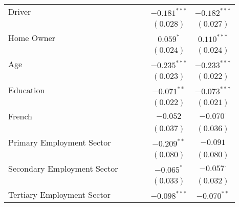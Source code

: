 \begin{center}
\begin{tiny}
\begin{longtable}{l@{} c@{} c@{} c@{} c@{} c@{}}
\quad Driver                                    &                &                &                & $-0.181^{***}$ & $-0.182^{***}$   \\
                                                &                &                &                & $(0.028)$      & $(0.027)$        \\
\quad Home Owner                                &                &                &                & $0.059^{*}$    & $0.110^{***}$    \\
                                                &                &                &                & $(0.024)$      & $(0.024)$        \\
\quad Age                                       &                &                &                & $-0.235^{***}$ & $-0.233^{***}$   \\
                                                &                &                &                & $(0.023)$      & $(0.022)$        \\
\quad Education                                 &                &                &                & $-0.071^{**}$  & $-0.073^{***}$   \\
                                                &                &                &                & $(0.022)$      & $(0.021)$        \\
\quad French                                    &                &                &                & $-0.052$       & $-0.070^{\cdot}$ \\
                                                &                &                &                & $(0.037)$      & $(0.036)$        \\
\quad Primary Employment Sector                 &                &                &                & $-0.209^{**}$  & $-0.091$         \\
                                                &                &                &                & $(0.080)$      & $(0.080)$        \\
\quad Secondary Employment Sector               &                &                &                & $-0.065^{*}$   & $-0.057^{\cdot}$ \\
                                                &                &                &                & $(0.033)$      & $(0.032)$        \\
\quad Tertiary Employment Sector                &                &                &                & $-0.098^{***}$ & $-0.070^{**}$    \\

\end{longtable}
\end{tiny}
\end{center}

